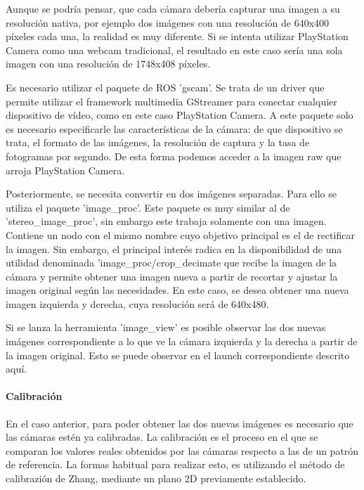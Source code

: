 Aunque se podría pensar, que cada cámara debería capturar una imagen a su
resolución nativa, por ejemplo dos imágenes con una resolución de 640x400
píxeles cada una, la realidad es muy diferente. Si se intenta utilizar
PlayStation Camera como una webcam tradicional, el resultado en este caso sería
una sola imagen con una resolución de 1748x408 píxeles.

Es necesario utilizar el paquete de ROS 'gscam'. Se trata de un driver que
permite utilizar el framework multimedia GStreamer para conectar cualquier
dispositivo de vídeo, como en este caso PlayStation Camera. A este paquete solo
es necesario especificarle las características de la cámara: de que dispositivo
se trata, el formato de las imágenes, la resolución de captura y la tasa de
fotogramas por segundo. De esta forma podemos acceder a la imagen raw que arroja
PlayStation Camera.

Posteriormente, se necesita convertir en dos imágenes separadas. Para ello se
utiliza el paquete 'image\_proc'. Este paquete es muy similar al de
'stereo\_image\_proc', sin embargo este trabaja solamente con una imagen.
Contiene un nodo con el mismo nombre cuyo objetivo principal es el de rectificar
la imagen. Sin embargo, el principal interés radica en la disponibilidad de una
utilidad denominada 'image\_proc/crop\_decimate que recibe la imagen de la
cámara y permite obtener una imagen nueva a partir de recortar y ajustar la
imagen original según las necesidades. En este caso, se desea obtener una nueva
imagen izquierda y derecha, cuya resolución será de 640x480.

Si se lanza la herramienta 'image\_view' es posible observar las dos nuevas
imágenes correspondiente a lo que ve la cámara izquierda y la derecha a partir
de la imagen original. Esto se puede observar en el launch correspondiente
descrito aquí.%

\paragraph{Calibración} \hspace{0pt}

En el caso anterior, para poder obtener las dos nuevas imágenes es necesario que
las cámaras estén ya calibradas. La calibración es el proceso en el que se
comparan los valores reales obtenidos por las cámaras respecto a las de un
patrón de referencia. La formas habitual para realizar esto, es utilizando el
método de calibrazión de Zhang, mediante un plano 2D previamente establecido. 

